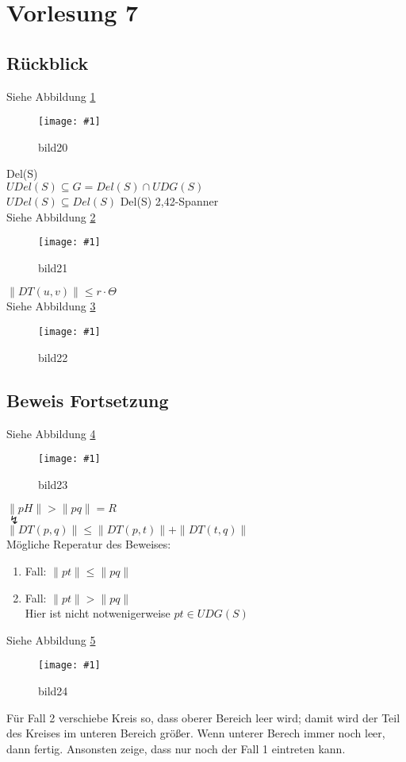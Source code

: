 \documentclass{article}
\newcommand{\bild}[4]{ %
	\begin{figure}[h!]
		\centering
		\texttt{[image: \#1]}
		\caption{#3}
		\label{#4}
	\end{figure}	
}
\newcommand{\sieheBild}[4]{
	Siehe Abbildung \ref{#4}
	\bild{#1}{#2}{#3}{#4}
}
\newcommand{\doubleAbs}[1]{
	\|#1\|
}
\begin{document}
\section{Vorlesung 7}
\subsection*{Rückblick}
\sieheBild{Bilder/20.png}{0.4}{bild20}{Bild 20}
Del(S)\\
$UDel(S) \subseteq G = Del(S) \cap UDG(S)$\\
$UDel(S) \subseteq Del(S)$
Del(S) 2,42-Spanner\\
\sieheBild{Bilder/21.png}{0.4}{bild21}{Bild 21}
$\doubleAbs{DT(u,v)} \leq r \cdot \Theta$\\
\sieheBild{Bilder/22.png}{0.4}{bild22}{Bild 22}

\subsection*{Beweis Fortsetzung}
\sieheBild{Bilder/23.png}{0.4}{bild23}{Bild 23}
$\doubleAbs{pH} > \doubleAbs{pq} = R$\\
$\lightning$\\
$\doubleAbs{DT(p,q)} \leq \doubleAbs{DT(p, t)}+ \doubleAbs{DT(t, q)}$\\
Mögliche Reperatur des Beweises:\\
\begin{enumerate}
	\item Fall: $\doubleAbs{pt} \leq \doubleAbs{pq}$
	\item Fall: $\doubleAbs{pt} > \doubleAbs{pq}$\\
	Hier ist nicht notwenigerweise $pt \in UDG(S)$\\
\end{enumerate}
\sieheBild{Bilder/24.png}{0.4}{bild24}{Bild 24}
Für Fall 2 verschiebe Kreis so, dass oberer Bereich leer wird;
damit wird der Teil des Kreises im unteren Bereich größer. 
Wenn unterer Berech immer noch leer, dann fertig. Ansonsten zeige, dass nur noch der Fall 1 eintreten kann.
\end{document}
